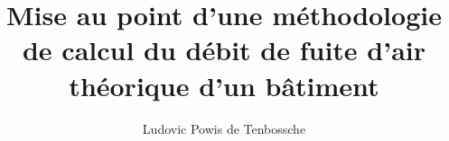 \title{Mise au point d'une méthodologie de calcul du débit de fuite d'air théorique d'un bâtiment}


\author{Ludovic Powis de Tenbossche}








\renewcommand{\submissiontext}{}




